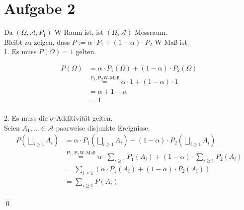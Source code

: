 \documentclass[10pt,a4paper]{article}
\begin{document}
\newpage

\section*{Aufgabe 2}
Da $(\Omega, \mathcal{A}, P_1)$ W-Raum ist, ist $(\Omega, \mathcal{A})$ Messraum.\\
Bleibt zu zeigen, dass $P:= \alpha \cdot P_1 + (1-\alpha)\cdot P_2$ W-Maß ist.\\[1ex]
1. Es muss $P(\Omega)=1$ gelten.

\begin{equation}
\begin{split}
P(\Omega) & = \alpha \cdot P_1(\Omega) + (1-\alpha)\cdot P_2(\Omega) \\
    &\overset{\mathrm{P_1, P_2 \text{W-Maß}}}{=}\alpha \cdot 1 + (1-\alpha) \cdot 1 \\
    & = \alpha + 1-\alpha \\
    & = 1
\end{split}
\end{equation}\\
2. Es muss die $\sigma$-Additivität gelten.\\
Seien $A_1,... \in \mathcal{A}$ paarweise disjunkte Ereignisse.\\

\begin{equation}
\begin{split}
P(\bigsqcup \limits_{i \geq 1 } A_i ) & = \alpha \cdot P_1(\bigsqcup \limits_{i \geq 1 } A_i ) + (1-\alpha)\cdot P_2(\bigsqcup \limits_{i \geq 1 } A_i) \\
&\overset{\mathrm{P_1, P_2 \text{W-Maß}}}{=} \alpha \cdot \sum \limits_{i \geq 1 } P_1(A_i) + (1-\alpha) \cdot \sum \limits_{i \geq 1 } P_2(A_i) \\
& = \sum \limits_{i \geq 1 }(\alpha \cdot P_1(A_i) + (1-\alpha) \cdot P_2(A_i)) \\
& = \sum \limits_{i \geq 1 } P(A_i)
\end{split}
\end{equation}\\
\qed
\newpage
\end{document}
